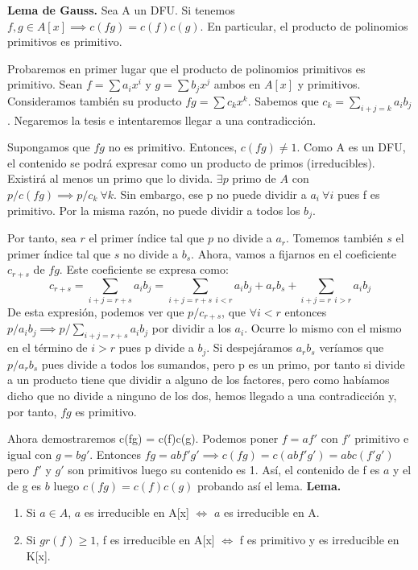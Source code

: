 \documentclass[11pt, a4paper, titlepage]{article}
\makeatletter
\newif\IfInSansMode
\let\oldsf\sffamily
\renewcommand*{\sffamily}{\oldsf\mathversion{sans}\InSansModetrue}
\let\oldnorm\normalfont
\renewcommand*{\normalfont}{\oldnorm\InSansModefalse\mathversion{normal}}
\renewenvironment{proof}[1][\proofname] {\vspace{-15pt}\par\pushQED{\qed}\normalfont\topsep6\p@\@plus6\p@\relax\trivlist\item[\hskip\labelsep\it#1\@addpunct{.}]\ignorespaces}{\popQED\endtrivlist\@endpefalse}
\renewenvironment{proof}[1][\proofname] {\par\pushQED{\qed}\normalfont\topsep6\p@\@plus6\p@\relax\trivlist\item[\hskip\labelsep\itshape\sffamily#1\@addpunct{.}]\ignorespaces}{\popQED\endtrivlist\@endpefalse}
\theoremstyle{theorem-style}
\theoremstyle{definition-style}
\theoremstyle{remark-style}
\theoremstyle{example-style}
\newenvironment{nlist}
{\begin{enumerate}
\renewcommand\labelenumi{(\emph{\roman{enumi})}}}
{\end{enumerate}}
\makeatother
\begin{document}
\textbf{Lema de Gauss.} Sea A un DFU. Si tenemos $f,g \in A[x]\implies c(fg) = c(f)c(g)$. En particular, el producto de polinomios primitivos es primitivo.\\
\begin{proof}
	Probaremos en primer lugar que el producto de polinomios primitivos es primitivo. Sean $f= \sum a_i x^i $ y $g= \sum b_j x^j$ ambos en $A[x]$ y primitivos. Consideramos también su producto $fg = \sum c_k x^k$. Sabemos que  $c_k = \sum_{i+j=k}a_ib_j$. Negaremos la tesis e intentaremos llegar a una contradicción.

	Supongamos que $fg$ no es primitivo. Entonces, $c(fg) \ne 1$. Como A es un DFU, el contenido se podrá expresar como un producto de primos (irreducibles). Existirá al menos un primo que lo divida. $\exists p $ primo de $A$ con $p/c(fg) \implies p/c_k \ \forall k$. Sin embargo, ese p no puede dividir a $a_i \ \forall i$ pues f es primitivo. Por la misma razón, no puede dividir a todos los $b_j$.

	Por tanto, sea $r$ el primer índice tal que $p$ no divide a $a_r$. Tomemos también $s$ el primer índice tal que $s$ no divide a $b_s$. Ahora, vamos a fijarnos en el coeficiente $c_{r+s}$ de $fg$. Este coeficiente se expresa como:
	 \[c_{r+s} = \sum _{i+j=r+s}a_ib_j = \sum _{i+j =r+s \ \ i < r}a_ib_j + a_rb_s + \sum_{i+j=r \ \ i > r}a_ib_j\]
	 De esta expresión, podemos ver que $p/c_{r+s}$, que $\forall i < r$ entonces $p/a_ib_j \implies p/\sum_{i+j =r+s}a_ib_j$ por dividir a los $a_i$. Ocurre lo mismo con el mismo en el término de $i > r $ pues p divide a $b_j$. Si despejáramos $a_rb_s$ veríamos que $p/a_rb_s$ pues divide a todos los sumandos, pero p es un primo, por tanto si divide a un producto tiene que dividir a alguno de los factores, pero como habíamos dicho que no divide a ninguno de los dos, hemos llegado a una contradicción y, por tanto, $fg$ es primitivo.

	 Ahora demostraremos c(fg) = c(f)c(g). Podemos poner $f=af'$ con $f'$ primitivo e igual con $g=bg'$. Entonces $fg= abf'g'\implies c(fg)=c(abf'g') = abc(f'g')$ pero $f'$ y $g'$ son primitivos luego su contenido es 1. Así, el contenido de f es $a$ y el de g es $b$ luego $c(fg) = c(f)c(g)$ probando así el lema.
\end{proof}
\newpage
\textbf{Lema.}
\begin{nlist}
	\item Si $a \in A$, $a$ es irreducible en A[x] $\Leftrightarrow$ $a$ es irreducible en A.
	\item Si $gr(f) \geq 1$, f es irreducible en A[x] $\Leftrightarrow$ f es primitivo y es irreducible en K[x].
 \end{nlist}
\end{document}
